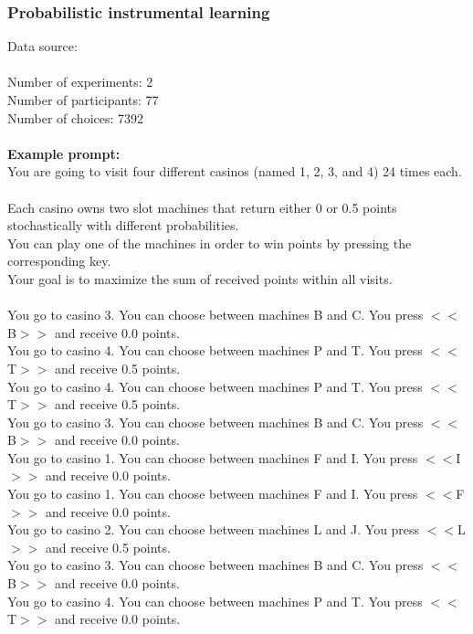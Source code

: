 \documentclass[pdflatex,sn-nature]{sn-jnl}%
\theoremstyle{thmstyleone}%
\theoremstyle{thmstyletwo}%
\theoremstyle{thmstylethree}%
\begin{document}
\subsubsection*{Probabilistic instrumental learning}
Data source:  \cite{lefebvre2017behavioural} \\ $~$ \\
Number of experiments: 2 $~$\\ 
Number of participants: 77 $~$\\ 
Number of choices: 7392 $~$\\ 
 $~$\\ 
\textbf{Example prompt:}
 $~$\\ 
You are going to visit four different casinos (named 1, 2, 3, and 4) 24 times each. $~$\\ 
Each casino owns two slot machines that return either 0 or 0.5 points stochastically with different probabilities. $~$\\ 
You can play one of the machines in order to win points by pressing the corresponding key. $~$\\ 
Your goal is to maximize the sum of received points within all visits. $~$\\ 
 $~$\\ 
You go to casino 3. You can choose between machines B and C. You press $<<$B$>>$ and receive 0.0 points. $~$\\ 
You go to casino 4. You can choose between machines P and T. You press $<<$T$>>$ and receive 0.5 points. $~$\\ 
You go to casino 4. You can choose between machines P and T. You press $<<$T$>>$ and receive 0.5 points. $~$\\ 
You go to casino 3. You can choose between machines B and C. You press $<<$B$>>$ and receive 0.0 points. $~$\\ 
You go to casino 1. You can choose between machines F and I. You press $<<$I$>>$ and receive 0.0 points. $~$\\ 
You go to casino 1. You can choose between machines F and I. You press $<<$F$>>$ and receive 0.0 points. $~$\\ 
You go to casino 2. You can choose between machines L and J. You press $<<$L$>>$ and receive 0.5 points. $~$\\ 
You go to casino 3. You can choose between machines B and C. You press $<<$B$>>$ and receive 0.0 points. $~$\\ 
You go to casino 4. You can choose between machines P and T. You press $<<$T$>>$ and receive 0.0 points. $~$\\ 
\end{document}
